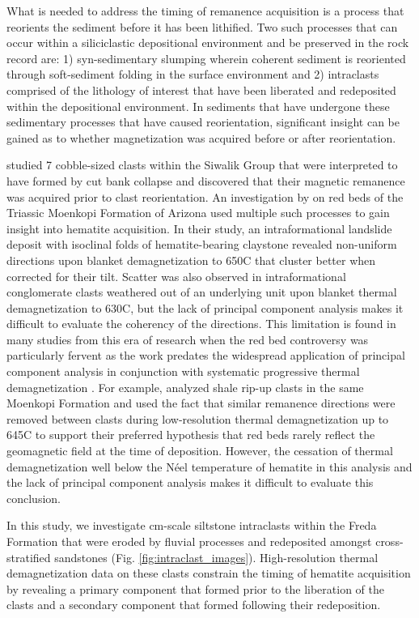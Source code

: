 \documentclass[11pt,letterpaper]{article}
\begin{document}
What is needed to address the timing of remanence acquisition is a process that reorients the sediment before it has been lithified. Two such processes that can occur within a siliciclastic depositional environment and be preserved in the rock record are: 1) syn-sedimentary slumping wherein coherent sediment is reoriented through soft-sediment folding in the surface environment and 2) intraclasts comprised of the lithology of interest that have been liberated and redeposited within the depositional environment. In sediments that have undergone these sedimentary processes that have caused reorientation, significant insight can be gained as to whether magnetization was acquired before or after reorientation. 

\cite{Tauxe1980a} studied 7 cobble-sized clasts within the Siwalik Group that were interpreted to have formed by cut bank collapse and discovered that their magnetic remanence was acquired prior to clast reorientation. An investigation by \cite{Purucker1980a} on red beds of the Triassic Moenkopi Formation of Arizona used multiple such processes to gain insight into hematite acquisition. In their study, an intraformational landslide deposit with isoclinal folds of hematite-bearing claystone revealed non-uniform directions upon blanket demagnetization to 650\textdegree C that cluster better when corrected for their tilt. Scatter was also observed in intraformational conglomerate clasts weathered out of an underlying unit upon blanket thermal demagnetization to 630\textdegree C, but the lack of principal component analysis makes it difficult to evaluate the coherency of the directions. This limitation is found in many studies from this era of research when the red bed controversy was particularly fervent as the work predates the widespread application of principal component analysis in conjunction with systematic progressive thermal demagnetization \citep{Kirschvink1980a, Van-Der-Voo2012a}. For example, \cite{Larson1982b} analyzed shale rip-up clasts in the same Moenkopi Formation and used the fact that similar remanence directions were removed between clasts during low-resolution thermal demagnetization up to 645\textdegree C to support their preferred hypothesis that red beds rarely reflect the geomagnetic field at the time of deposition. However, the cessation of thermal demagnetization well below the N\'eel temperature of hematite in this analysis and the lack of principal component analysis makes it difficult to evaluate this conclusion.  

In this study, we investigate cm-scale siltstone intraclasts within the Freda Formation that were eroded by fluvial processes and redeposited amongst cross-stratified sandstones (Fig. \ref{fig:intraclast_images}). High-resolution thermal demagnetization data on these clasts constrain the timing of hematite acquisition by revealing a primary component that formed prior to the liberation of the clasts and a secondary component that formed following their redeposition.
\end{document}
